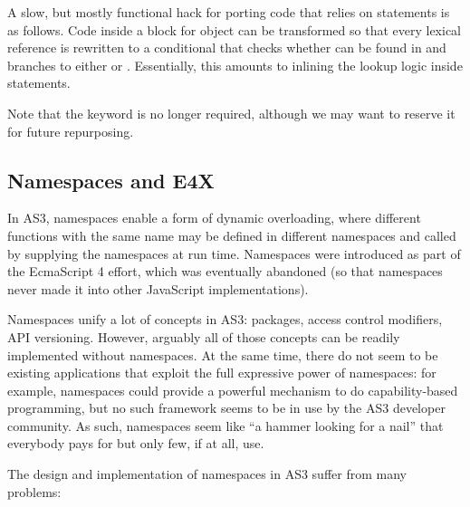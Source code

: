 A slow, but mostly functional hack for porting code that relies on
 statements is as follows. Code inside a
 block for object  can be transformed so that
every lexical reference  is rewritten to a conditional that checks
whether  can be found in  and branches to either
 or . Essentially, this amounts to inlining the
lookup logic inside  statements.

Note that the keyword  is no longer required, although we may want to
reserve it for future repurposing.


\subsection{Namespaces and E4X}

In AS3, namespaces enable a form of dynamic overloading, where different functions
with the same name may be defined in different namespaces and called
by supplying the namespaces at run time. Namespaces were introduced as
part of the EcmaScript 4 effort, which was eventually abandoned (so
that namespaces never made it into other JavaScript implementations).

Namespaces unify a lot of concepts in AS3: packages, access
control modifiers, API versioning. However, arguably all of those
concepts can be readily implemented without namespaces. At the same time, there do not seem to be existing
applications that exploit the full expressive power of namespaces: for
example, namespaces could provide a powerful mechanism to do
capability-based programming, but no such framework seems to be in use by
the AS3 developer community. As such, namespaces seem like ``a hammer
looking for a nail'' that everybody pays for but only few, if at all, use.

The design and implementation of namespaces in AS3 suffer from many problems:

